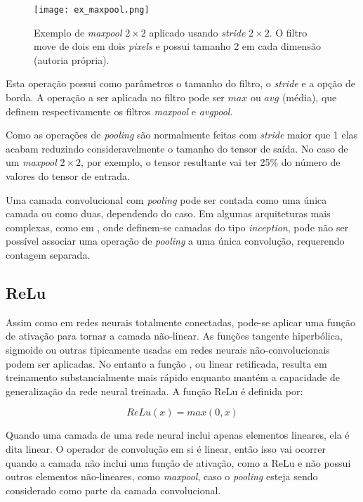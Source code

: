 \begin{figure}[!htb]
	\centering
	\texttt{[image: ex\_maxpool.png]}
	\caption[Exemplo de \emph{maxpool} $2 \times 2$]{
		Exemplo de \emph{maxpool} $2 \times 2$ aplicado usando
		\emph{stride} $2 \times 2$. O filtro move de dois em dois \emph{pixels}
		e possui tamanho 2 em cada dimensão (autoria própria).}
	\label{fig:ex_maxpool}
\end{figure}

Esta operação possui como parâmetros o tamanho do filtro, o \emph{stride} e
a opção de
borda. A operação a ser aplicada no filtro pode ser $max$ ou $avg$ (média),
que definem respectivamente os filtros \emph{maxpool} e \emph{avgpool}.

Como as operações de \emph{pooling} são normalmente feitas com \emph{stride}
maior que 1 elas
acabam reduzindo consideravelmente o tamanho do tensor de saída. No caso de um
\emph{maxpool} $2 \times 2$, por exemplo, o tensor resultante vai ter 25\% do
número de valores do tensor de entrada.

Uma camada convolucional com \emph{pooling} pode ser contada como uma única
camada ou
como duas, dependendo do caso. Em algumas arquiteturas mais complexas, como em
\cite{szegedy2015going}, onde definem-se camadas do tipo \emph{inception},
pode não ser possível associar uma operação de \emph{pooling} a uma única
convolução, requerendo contagem separada.

\subsection{ReLu}
Assim como em redes neurais totalmente conectadas, pode-se aplicar uma função
de ativação para tornar a camada não-linear. As funções tangente
hiperbólica, sigmoide ou outras tipicamente usadas em redes neurais
não-convolucionais podem ser aplicadas. No entanto a função
, ou
linear retificada, resulta em treinamento substancialmente mais rápido enquanto
mantém a capacidade de generalização da rede neural treinada. A função
ReLu é definida por:


\begin{equation}
	ReLu(x) = max(0,x)
\end{equation}

Quando uma camada de uma rede neural inclui apenas elementos lineares,
ela é dita linear. O operador de convolução em si é linear, então
isso vai ocorrer quando a camada não inclui uma função de ativação, como
a ReLu e não possui outros elementos não-lineares, como \emph{maxpool},
caso o \emph{pooling} esteja sendo considerado como parte da camada
convolucional.


